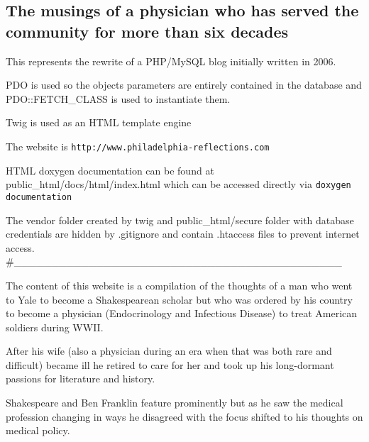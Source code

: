 \subsection*{The musings of a physician who has served the community for more than six decades}

This represents the rewrite of a P\+H\+P/\+My\+S\+QL blog initially written in 2006.


\begin{DoxyItemize}
\item P\+DO is used so the objects\textquotesingle{} parameters are entirely contained in the database and P\+D\+O\+::\+F\+E\+T\+C\+H\+\_\+\+C\+L\+A\+SS is used to instantiate them.
\item Twig is used as an H\+T\+ML template engine
\end{DoxyItemize}

The website is {\tt http\+://www.\+philadelphia-\/reflections.\+com}

H\+T\+ML doxygen documentation can be found at {\ttfamily public\+\_\+html/docs/html/index.\+html} which can be accessed directly via {\tt doxygen documentation} 



The {\ttfamily vendor} folder created by twig and {\ttfamily public\+\_\+html/secure} folder with database credentials are hidden by {\ttfamily .gitignore} and contain {\ttfamily .htaccess} files to prevent internet access. \#\+\_\+\+\_\+\+\_\+\+\_\+\+\_\+\+\_\+\+\_\+\+\_\+\+\_\+\+\_\+\+\_\+\+\_\+\+\_\+\+\_\+\+\_\+\+\_\+\+\_\+\+\_\+\+\_\+\+\_\+\+\_\+\+\_\+\+\_\+\+\_\+\+\_\+\+\_\+\+\_\+\+\_\+\+\_\+\+\_\+\+\_\+\+\_\+\+\_\+\+\_\+\+\_\+\+\_\+\+\_\+\+\_\+\+\_\+\+\_\+\+\_\+\+\_\+\+\_\+\+\_\+

The content of this website is a compilation of the thoughts of a man who went to Yale to become a Shakespearean scholar but who was ordered by his country to become a physician (Endocrinology and Infectious Disease) to treat American soldiers during W\+W\+II.

After his wife (also a physician during an era when that was both rare and difficult) became ill he retired to care for her and took up his long-\/dormant passions for literature and history.

Shakespeare and Ben Franklin feature prominently but as he saw the medical profession changing in ways he disagreed with the focus shifted to his thoughts on medical policy. 
